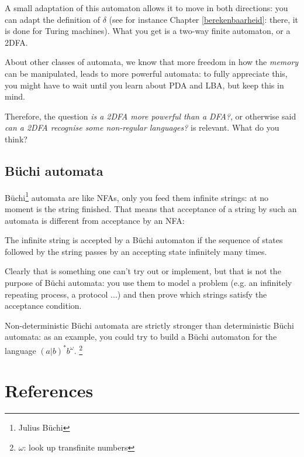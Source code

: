 A small adaptation of this automaton allows it to move in both
directions: you can adapt the definition of $\delta$ (see for instance
Chapter \ref{berekenbaarheid}: there, it is done for Turing
machines). What you get is a two-way finite automaton, or a 2DFA.

About other classes of automata, we know that more freedom in how the
{\em memory} can be manipulated, leads to more powerful automata: to
fully appreciate this, you might have to wait until you learn about
PDA and LBA, but keep this in mind.

Therefore, the question {\em is a 2DFA more powerful than a DFA?}, or
otherwise said {\em can a 2DFA recognise some non-regular languages?}
is relevant. What do you think?



\subsection{B\"{u}chi automata}

B\"{u}chi\footnote{Julius B\"{u}chi} automata are like NFAs, only you
feed them infinite strings: at no moment is the string finished.
That means that acceptance of a string by such an automata is
different from acceptance by an NFA:

\begin{definition}
The infinite string is accepted by a B\"{u}chi automaton if the
sequence of states followed by the string passes by an accepting state infinitely many times.
\end{definition}

Clearly that is something one can't try out or implement, but that is
not the purpose of B\"{u}chi automata: you use them to model a problem
(e.g. an infinitely repeating process, a protocol ...) and then prove
which strings satisfy the acceptance condition.

Non-deterministic B\"{u}chi automata are strictly stronger than
deterministic B\"{u}chi automata: as an example, you could try to
build a B\"{u}chi automaton for the language $(a|b)^*b^\omega$. \footnote{$\omega$: look up transfinite numbers}




\section{References}

